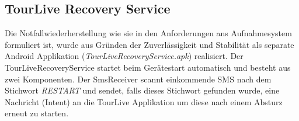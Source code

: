 \subsection{TourLive Recovery Service}
Die Notfallwiederherstellung wie sie in den Anforderungen ans Aufnahmesystem formuliert ist, wurde aus Gründen der Zuverlässigkeit und Stabilität als separate Android Applikation (\textit{TourLiveRecoveryService.apk}) realisiert. Der TourLiveRecoveryService startet beim Gerätestart automatisch und besteht aus zwei Komponenten. Der SmsReceiver scannt einkommende SMS nach dem Stichwort \textit{RESTART} und sendet, falls dieses Stichwort gefunden wurde, eine Nachricht (Intent) an die TourLive Applikation um diese nach einem Absturz erneut zu starten. 
